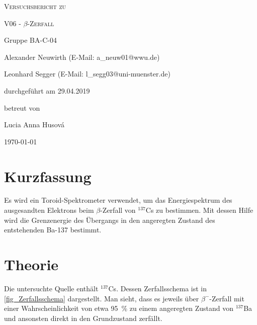 \documentclass[
	a4paper,
	12pt,
	pagesize,
	ngerman
]{scrartcl}
\begin{document}
	\begin{titlepage}
		\centering
		{\scshape\LARGE Versuchsbericht zu \par}
		\vspace{1cm}
		{\scshape\huge V06 - $\beta$-Zerfall \par} %
		\vspace{2.5cm}
		{\LARGE Gruppe BA-C-04 \par}
		\vspace{0.5cm}

		{\large Alexander Neuwirth (E-Mail: a\_neuw01@wwu.de) \par}
		{\large Leonhard Segger (E-Mail: l\_segg03@uni-muenster.de) \par}
		\vfill

		durchgeführt am 29.04.2019\par %
		betreut von\par
		{\large Lucia Anna Husová} %

		\vfill

		{\large \today\par}
	\end{titlepage}
	\tableofcontents
	\newpage


	\section{Kurzfassung}
	Es wird ein Toroid-Spektrometer verwendet, um das Energiespektrum des ausgesandten Elektrons beim $\beta$-Zerfall von $^{137}$Cs zu bestimmen.
	Mit dessen Hilfe wird die Grenzenergie des Übergangs in den angeregten Zustand des entstehenden Ba-137 bestimmt.

  \section{Theorie}
	Die untersuchte Quelle enthält $^{137}$Cs.
	Dessen Zerfallsschema ist in \cref{fig_Zerfallsschema} dargestellt.
	Man sieht, dass es jeweils über $\beta^-$-Zerfall mit einer Wahrscheinlichkeit von etwa \SI{95}{\percent} zu einem angeregten Zustand von $^{137}$Ba und ansonsten direkt in den Grundzustand zerfällt.
\end{document}
